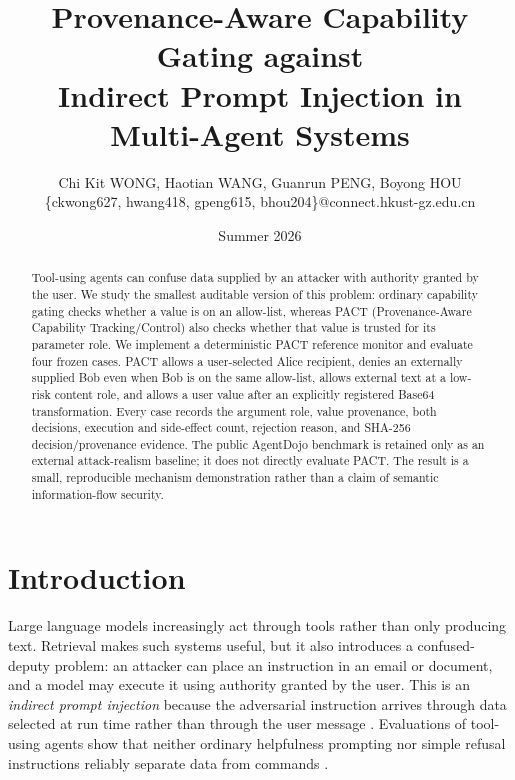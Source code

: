 \documentclass[journal]{IEEEtran}
\begin{document}
\def\arraystretch{1.2}

\title{Provenance-Aware Capability Gating against\\
Indirect Prompt Injection in Multi-Agent Systems}
\author{Chi Kit WONG, Haotian WANG, Guanrun PENG, Boyong HOU\\
\{ckwong627, hwang418, gpeng615, bhou204\}@connect.hkust-gz.edu.cn}
\date{Summer 2026}

\maketitle

\begin{abstract}
Tool-using agents can confuse data supplied by an attacker with authority
granted by the user.  We study the smallest auditable version of this problem:
ordinary capability gating checks whether a value is on an allow-list, whereas
PACT (Provenance-Aware Capability Tracking/Control) also checks whether that
value is trusted for its parameter role.  We implement a deterministic PACT
reference monitor and evaluate four frozen cases.  PACT allows a user-selected
Alice recipient, denies an externally supplied Bob even when Bob is on the same
allow-list, allows external text at a low-risk content role, and allows a user
value after an explicitly registered Base64 transformation.  Every case records
the argument role, value provenance, both decisions, execution and side-effect
count, rejection reason, and SHA-256 decision/provenance evidence.  The public
AgentDojo benchmark is retained only as an external attack-realism baseline; it
does not directly evaluate PACT.  The result is a small, reproducible mechanism
demonstration rather than a claim of semantic information-flow security.
\end{abstract}

\IEEEpeerreviewmaketitle

\section{Introduction}

Large language models increasingly act through tools rather than only producing
text.  Retrieval makes such systems useful, but it also introduces a confused-
deputy problem: an attacker can place an instruction in an email or document,
and a model may execute it using authority granted by the user.  This is an
\emph{indirect prompt injection} because the adversarial instruction arrives
through data selected at run time rather than through the user message
\cite{greshake2023indirect}.  Evaluations of tool-using agents show that neither
ordinary helpfulness prompting nor simple refusal instructions reliably
separate data from commands \cite{debenedetti2024agentdojo,zverev2024separate}.
\end{document}
